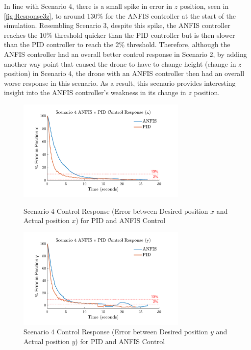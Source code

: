 In line with Scenario 4, there is a small spike in error in $z$ position, seen in \ref{fig:Response3z}, to around 130\% for the ANFIS controller at the start of the simulation. Resembling Scenario 3, despite this spike, the ANFIS controller reaches the 10\% threshold quicker than the PID controller but is then slower than the PID controller to reach the 2\% threshold. Therefore, although the ANFIS controller had an overall better control response in Scenario 2, by adding another way point that caused the drone to have to change height (change in $z$ position) in Scenario 4, the drone with an ANFIS controller then had an overall worse response in this scenario. As a result, this scenario provides interesting insight into the ANFIS controller's weakness in its change in $z$ position.
\begin{figure}[H]
    \centering
    \begin{minipage}[b]{0.45\textwidth}
        \centering
        \includegraphics[height=5cm,keepaspectratio]{img/Scenario 4 Error in x Position.pdf}
        \caption{Scenario 4 Control Response (Error between Desired position $x$ and Actual position $x$) for PID and ANFIS Control}
        \label{fig:Response4x}
    \end{minipage}
    \hfill
    \begin{minipage}[b]{0.45\textwidth}
        \centering
        \includegraphics[height=5cm,keepaspectratio]{img/Scenario 4 Error in y Position.pdf}
        \caption{Scenario 4 Control Response (Error between Desired position $y$ and Actual position $y$) for PID and ANFIS Control}
        \label{fig:Response4y}
    \end{minipage}
\end{figure}

